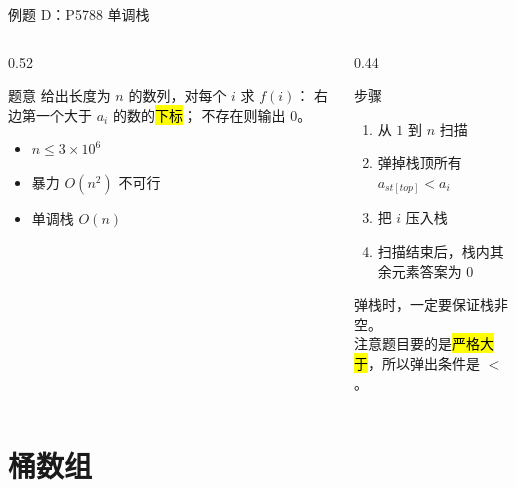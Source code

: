 \documentclass[aspectratio=169]{beamer}
\begin{document}
\begin{frame}{例题 D：P5788 单调栈}
    \begin{columns}[T]
        \begin{column}{0.52\textwidth}
            \small
            \begin{block}{题意}
                \footnotesize
                给出长度为 $n$ 的数列，对每个 $i$ 求 $f(i)$：
                右边第一个大于 $a_i$ 的数的\hl{下标}；
                不存在则输出 $0$。
            \end{block}
            \begin{itemize}
                \item $n\le 3\times10^6$
                \item 暴力 $O(n^2)$ 不可行
                \item 单调栈 $O(n)$
            \end{itemize}
        \end{column}
        \begin{column}{0.44\textwidth}
            \begin{block}{步骤}
                \footnotesize
                \begin{enumerate}
                    \item 从 $1$ 到 $n$ 扫描
                    \item 弹掉栈顶所有 $a_{st[top]}< a_i$
                    \item 把 $i$ 压入栈
                    \item 扫描结束后，栈内其余元素答案为 $0$
                \end{enumerate}
            \end{block}
            \vspace{0.4em}
            \footnotesize
            弹栈时，一定要保证栈非空。\\
            注意题目要的是\hl{严格大于}，所以弹出条件是 $<$。
        \end{column}
    \end{columns}
\end{frame}

\section{桶数组}
\end{document}

